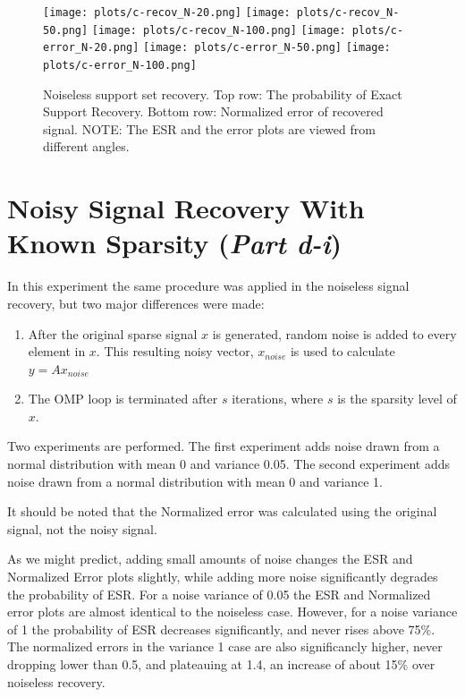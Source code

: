 \documentclass{article}
\begin{document}
\begin{figure}[H]
    \captionsetup{width=.75\linewidth}
    \centering
        \texttt{[image: plots/c-recov\_N-20.png]}
        \texttt{[image: plots/c-recov\_N-50.png]}
        \texttt{[image: plots/c-recov\_N-100.png]}
        \newline
        \texttt{[image: plots/c-error\_N-20.png]}
        \texttt{[image: plots/c-error\_N-50.png]}
        \texttt{[image: plots/c-error\_N-100.png]}
        \caption{Noiseless support set recovery. Top row: The probability of Exact Support Recovery. Bottom row: Normalized error of recovered signal. NOTE: The ESR and the error plots are viewed from different angles.}
\end{figure}
















\newpage
\section{Noisy Signal Recovery With Known Sparsity ({\it Part d-i})}

In this experiment the same procedure was applied in the noiseless signal recovery, but two major differences were made:
\begin{enumerate}
    \item After the original sparse signal $x$ is generated, random noise is added to every element in $x$.
        This resulting noisy vector, $x_{noise}$ is used to calculate $y = Ax_{noise}$
    \item The OMP loop is terminated after $s$ iterations, where $s$ is the sparsity level of $x$.
\end{enumerate}
Two experiments are performed.
The first experiment adds noise drawn from a normal distribution with mean 0 and variance 0.05.
The second experiment adds noise drawn from a normal distribution with mean 0 and variance 1.

It should be noted that the Normalized error was calculated using the original signal, not the noisy signal.

As we might predict, adding small amounts of noise changes the ESR and Normalized Error plots slightly, while adding more noise significantly degrades the probability of ESR.
For a noise variance of 0.05 the ESR and Normalized error plots are almost identical to the noiseless case.
However, for a noise variance of 1 the probability of ESR decreases significantly, and never rises above 75\%.
The normalized errors in the variance 1 case are also significancly higher, never dropping lower than 0.5, and plateauing at 1.4, an increase of about 15\% over noiseless recovery.
\end{document}
